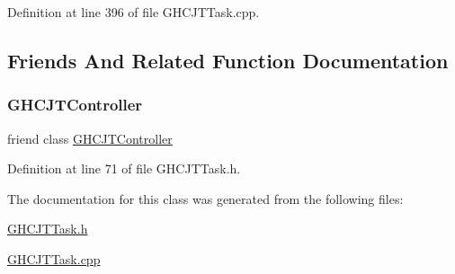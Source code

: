 Definition at line 396 of file G\+H\+C\+J\+T\+Task.\+cpp.



\subsection{Friends And Related Function Documentation}
\hypertarget{classgocra_1_1GHCJTTask_ad38e451271fa3f064d99a850190a56e7}{}\label{classgocra_1_1GHCJTTask_ad38e451271fa3f064d99a850190a56e7} 
\subsubsection{\texorpdfstring{G\+H\+C\+J\+T\+Controller}{GHCJTController}}
{\footnotesize\ttfamily friend class \hyperlink{classgocra_1_1GHCJTController}{G\+H\+C\+J\+T\+Controller}\hspace{0.3cm}{\ttfamily [friend]}}



Definition at line 71 of file G\+H\+C\+J\+T\+Task.\+h.



The documentation for this class was generated from the following files\+:\begin{DoxyCompactItemize}
\item 
\hyperlink{GHCJTTask_8h}{G\+H\+C\+J\+T\+Task.\+h}\item 
\hyperlink{GHCJTTask_8cpp}{G\+H\+C\+J\+T\+Task.\+cpp}\end{DoxyCompactItemize}
